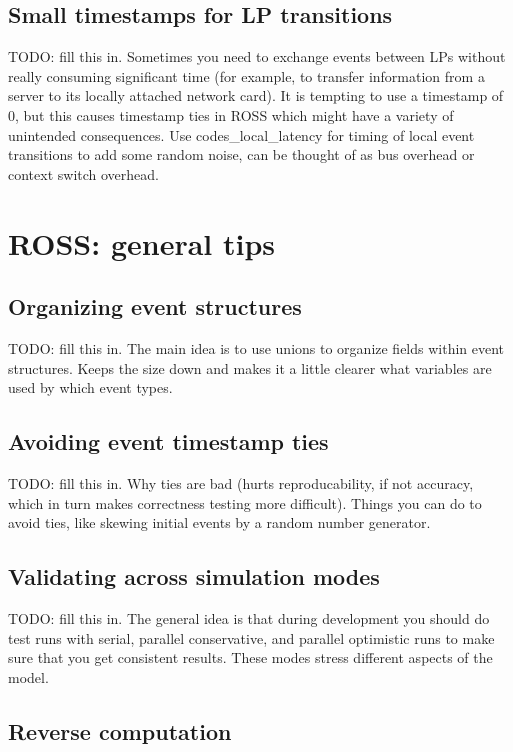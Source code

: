 \documentclass[conference,10pt,compsocconf,onecolumn]{IEEEtran}
\begin{document}
\subsection{Small timestamps for LP transitions}

TODO: fill this in.  Sometimes you need to exchange events between LPs
without really consuming significant time (for example, to transfer
information from a server to its locally attached network card).  It is
tempting to use a timestamp of 0, but this causes timestamp ties in ROSS
which might have a variety of unintended consequences.  Use
codes\_local\_latency for timing of local event transitions to add some
random noise, can be thought of as bus overhead or context switch overhead.

\section{ROSS: general tips}

\subsection{Organizing event structures}

TODO: fill this in.  The main idea is to use unions to organize fields
within event structures.  Keeps the size down and makes it a little clearer
what variables are used by which event types.

\subsection{Avoiding event timestamp ties}

TODO: fill this in.   Why ties are bad (hurts reproducability, if not
accuracy, which in turn makes correctness testing more difficult).  Things
you can do to avoid ties, like skewing initial events by a random number
generator.

\subsection{Validating across simulation modes}

TODO: fill this in.  The general idea is that during development you should
do test runs with serial, parallel conservative, and parallel optimistic
runs to make sure that you get consistent results.  These modes stress
different aspects of the model.

\subsection{Reverse computation}
\end{document}
